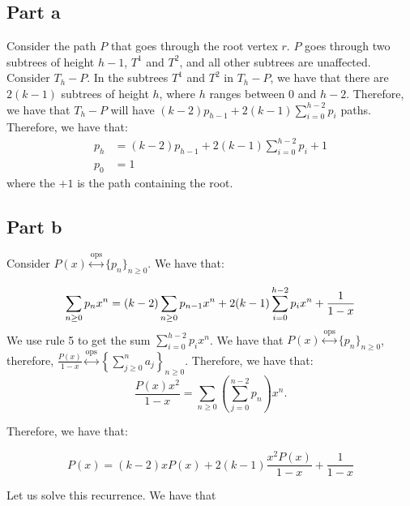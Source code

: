 \documentclass[]{article}
\newcommand{\ops}{\overset{\text{ops}}{\leftrightarrow}}
\begin{document}
\subsection{Part a}
Consider the path $P$ that goes through the root vertex $r$. $P$ goes through two subtrees of height $h-1$, $T^1$ and $T^2$, and all other subtrees are unaffected. Consider $T_h - P$. In the subtrees $T^1$ and $T^2$ in $T_h - P$, we have that there are $2(k-1)$ subtrees of height $h$, where $h$ ranges between $0$ and $h-2$. Therefore, we have that $T_h - P$ will have $(k-2)p_{h-1} + 2(k-1)\sum_{i = 0}^{h-2} p_i$ paths.
Therefore, we have that:
\begin{align}
	p_h &= (k-2)p_{h-1} + 2(k-1)\sum_{i = 0}^{h-2} p_i + 1\\
	p_0 &= 1
\end{align}
where the $+1$ is the path containing the root. 
\subsection{Part b}
Consider $P(x) \ops \lbrace p_n \rbrace_{n \geq 0}$.
We have that:

\begin{equation}
	\sum_{n \geq 0} p_n x^n = (k-2) \sum_{n \geq 0} p_{n-1} x^n + 2(k-1)\sum_{i = 0}^{h-2} p_i x^n + \frac{1}{1-x}\\
\end{equation}
We use rule 5 to get the sum $ \sum_{i = 0}^{h-2} p_i x^n$. We have that $P(x) \ops \lbrace p_n \rbrace_{n \geq 0}$, therefore, $\frac{P(x)}{1-x} \ops \left\lbrace \sum_{j \geq 0}^n a_j  \right\rbrace_{n \geq 0}$. Therefore, we have that:
\begin{equation}
	\frac{P(x) x^2}{1-x} = \sum_{n \geq 0} \left(\sum_{j = 0}^{n - 2} p_n\right) x^n.
\end{equation}

Therefore, we have that:

\begin{equation}
	P(x) = (k-2) x P(x)  + 2(k-1) \frac{x^2 P(x)}{1-x}+ \frac{1}{1-x}
\end{equation}

Let us solve this recurrence. We have that
\end{document}
